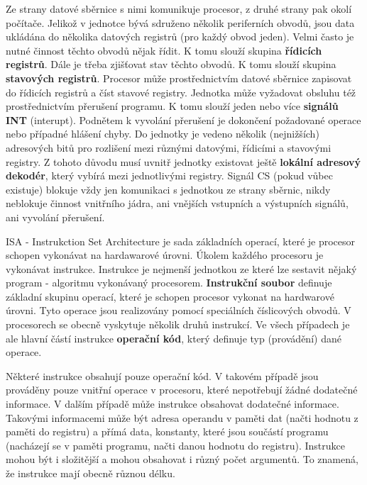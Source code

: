 Ze strany datové sběrnice s nimi komunikuje procesor, z druhé strany pak okolí počítače. Jelikož v jednotce bývá sdruženo několik periferních obvodů, jsou data ukládána do několika datových registrů (pro každý obvod jeden). Velmi často je nutné činnost těchto obvodů nějak řídit. K tomu slouží skupina {\bf řídicích registrů}. Dále je třeba zjišťovat stav těchto obvodů. K tomu slouží skupina {\bf stavových registrů}. Procesor může prostřednictvím datové sběrnice zapisovat do řídicích registrů a číst stavové registry. Jednotka může vyžadovat obsluhu též prostřednictvím přerušení programu. K tomu slouží jeden nebo více {\bf signálů INT} (interupt). Podnětem k vyvolání přerušení je dokončení požadované operace nebo případné hlášení chyby. Do jednotky je vedeno několik (nejnižších) adresových bitů pro rozlišení mezi různými datovými, řídicími a stavovými registry. Z tohoto důvodu musí uvnitř jednotky existovat ještě {\bf lokální adresový dekodér}, který vybírá mezi jednotlivými registry. Signál CS (pokud vůbec existuje) blokuje vždy jen komunikaci s jednotkou ze strany sběrnic, nikdy neblokuje činnost vnitřního jádra, ani vnějších vstupních a výstupních signálů, ani vyvolání přerušení.




ISA - Instrukction Set Architecture je sada základních operací, které je procesor schopen vykonávat na hardawarové úrovni. Úkolem každého procesoru je vykonávat instrukce. Instrukce je nejmenší jednotkou ze které lze sestavit nějaký program - algoritmu vykonávaný procesorem. {\bf Instrukční soubor} definuje základní skupinu operací, které je schopen procesor vykonat na hardwarové úrovni. Tyto operace jsou realizovány pomocí speciálních číslicových obvodů. V procesorech se obecně vyskytuje několik druhů instrukcí. Ve všech případech je ale hlavní částí instrukce {\bf operační kód}, který definuje typ (provádění) dané operace.

Některé instrukce obsahují pouze operační kód. V takovém případě jsou prováděny pouze vnitřní operace v procesoru, které nepotřebují žádné dodatečné informace. V dalším případě může instrukce obsahovat dodatečné informace. Takovými informacemi může být adresa operandu v paměti dat (načti hodnotu z paměti do registru) a přímá data, konstanty, které jsou součástí programu (nacházejí se v paměti programu, načti danou hodnotu do registru). Instrukce mohou být i složitější a mohou obsahovat i různý počet argumentů. To znamená, že instrukce mají obecně různou délku.


